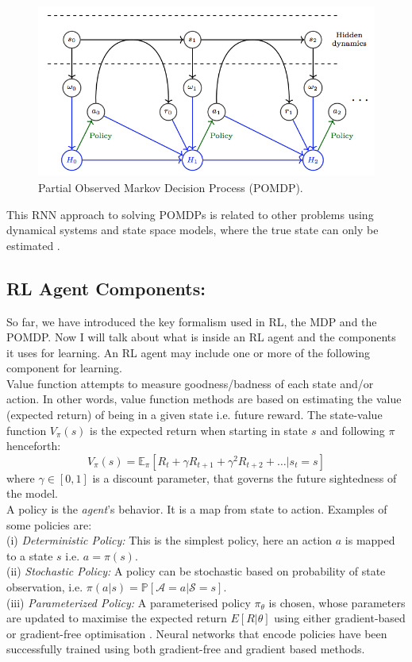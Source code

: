 \begin{figure}[t]
	\includegraphics[width=0.9\linewidth ]{fig/pomdp.png}
    \vspace{-2mm}
    \caption{Partial Observed Markov Decision Process (POMDP).}
    \label{fig:pomdp}
\end{figure}

This RNN approach to solving
POMDPs is related to other problems using dynamical systems
and state space models, where the true state can only be
estimated \cite{bertsekas2005dynamic}.


\subsection{RL Agent Components:}
So far, we have introduced the key formalism used in RL,
the MDP and the POMDP. Now I will talk about what is inside an RL agent and the components it uses for learning. An RL agent may include one or more of the following component for learning.\\
Value function attempts to measure goodness/badness of each state and/or action.
In other words, value function methods are based on estimating the value
(expected return) of being in a given state i.e. future reward.
The state-value
function $V_{\pi}(s)$
 is the expected return when starting in state $s$
and following $\pi$ henceforth:
$$V_{\pi}(s) = \mathbb{E}_\pi [R_t +\gamma R_{t+1} + \gamma^2 R_{t+2}+\ldots  | s_t =s ]$$
where $\gamma \in [0,1]$ is a discount parameter, that governs the future sightedness of the model.
\\
  A policy is the {\em agent}'s behavior. It is a map from state to action. Examples of some policies are: \\
(i) {\em Deterministic Policy:} This is the simplest policy, here an action $a$ is mapped to a state $s$ i.e. $a = \pi(s)$.\\
(ii) {\em Stochastic Policy:} A policy can be stochastic based on probability of state observation, i.e. $\pi(a|s) = \mathbb{P}[\mathcal{A}=a |  \mathcal{S} = s]$.\\
(iii) {\em Parameterized Policy:} A parameterised policy $\pi_\theta$ is chosen, whose
parameters are updated to maximise the expected return $E[R|\theta]$ using either gradient-based or gradient-free optimisation \cite{deisenroth2013survey}. Neural networks that encode policies have been successfully
trained using both gradient-free \cite{gomez2005evolving, cuccu2011intrinsically, koutnik2013evolving} and gradient based \cite{williams1992simple, lillicrap2015continuous, heess2015learning} methods.

